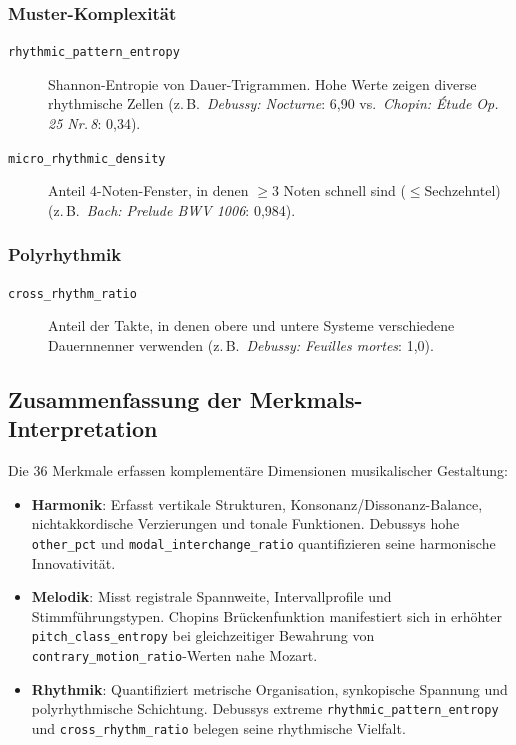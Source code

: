 \documentclass[10pt,a4paper]{article}
\theoremstyle{definition}
\begin{document}
\subsubsection*{Muster-Komplexität}
\begin{description}
    \item[\texttt{rhythmic\_pattern\_entropy}] Shannon-Entropie von Dauer-Trigrammen. Hohe Werte zeigen diverse rhythmische Zellen (z.\,B.\ \emph{Debussy: Nocturne}: 6{,}90 vs.\ \emph{Chopin: Étude Op.\,25 Nr.\,8}: 0{,}34).
    
    \item[\texttt{micro\_rhythmic\_density}] Anteil 4-Noten-Fenster, in denen $\geq$3 Noten schnell sind ($\leq$Sechzehntel) (z.\,B.\ \emph{Bach: Prelude BWV 1006}: 0{,}984).
\end{description}

\subsubsection*{Polyrhythmik}
\begin{description}
    \item[\texttt{cross\_rhythm\_ratio}] Anteil der Takte, in denen obere und untere Systeme verschiedene Dauernnenner verwenden (z.\,B.\ \emph{Debussy: Feuilles mortes}: 1{,}0).
\end{description}

\subsection{Zusammenfassung der Merkmals-Interpretation}

Die 36 Merkmale erfassen komplementäre Dimensionen musikalischer Gestaltung:
\begin{itemize}
    \item \textbf{Harmonik}: Erfasst vertikale Strukturen, Konsonanz/Dissonanz-Balance, nichtakkordische Verzierungen und tonale Funktionen. Debussys hohe \texttt{other\_pct} und \texttt{modal\_interchange\_ratio} quantifizieren seine harmonische Innovativität.
    
    \item \textbf{Melodik}: Misst registrale Spannweite, Intervallprofile und Stimmführungstypen. Chopins Brückenfunktion manifestiert sich in erhöhter \texttt{pitch\_class\_entropy} bei gleichzeitiger Bewahrung von \texttt{contrary\_motion\_ratio}-Werten nahe Mozart.
    
    \item \textbf{Rhythmik}: Quantifiziert metrische Organisation, synkopische Spannung und polyrhythmische Schichtung. Debussys extreme \texttt{rhythmic\_pattern\_entropy} und \texttt{cross\_rhythm\_ratio} belegen seine rhythmische Vielfalt.
\end{itemize}
\end{document}
